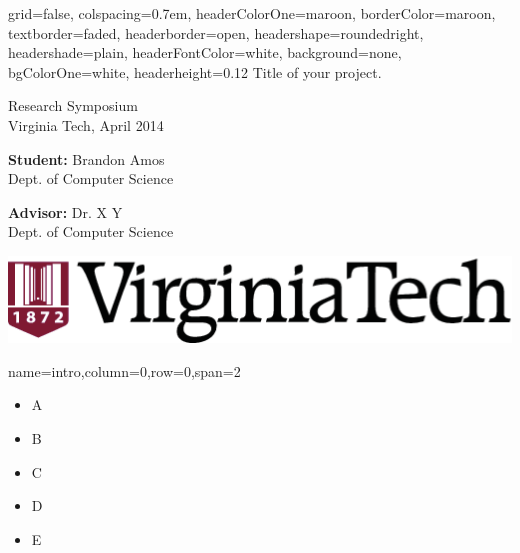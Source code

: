 \documentclass[landscape,specialSize,fontscale=0.3]{./poster/poster}
\begin{document}
\begin{poster}{
  grid=false, %
  colspacing=0.7em, %
  headerColorOne=maroon, borderColor=maroon, %
  textborder=faded, %
  headerborder=open, headershape=roundedright,
  headershade=plain, headerFontColor=white,
  background=none, bgColorOne=white,
  headerheight=0.12\textheight
}{
}{
  \sc\Huge Title of your project.
}{
  \bigskip\large
  \begin{minipage}{0.3\textwidth}
    Research Symposium \\
    Virginia Tech, April 2014
  \end{minipage}
  \begin{minipage}{0.3\textwidth}
    {\bf Student:} Brandon Amos \\
    Dept. of Computer Science
  \end{minipage}
  \begin{minipage}{0.3\textwidth}
    {\bf Advisor:} Dr. X Y \\
    Dept. of Computer Science
  \end{minipage}
}{
  \includegraphics[height=0.05\textheight]{./poster/vtlogo-new}
}

    {name=intro,column=0,row=0,span=2}{
  \begin{itemize}
    \item A
    \item B
    \item C
    \item D
    \item E
  \end{itemize}
}


\end{poster}
\end{document}
